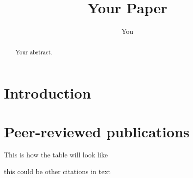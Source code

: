 \documentclass{article}
\title{Your Paper}
\author{You}
\begin{document}
\maketitle

\begin{abstract}
Your abstract.
\end{abstract}

\section{Introduction}


\section{Peer-reviewed publications}

This is how the table will look like




this could be other citations in text

\cite{zak_et_al_1993}

\cite{ziska_et_al_2004} 


{}
\end{document}
